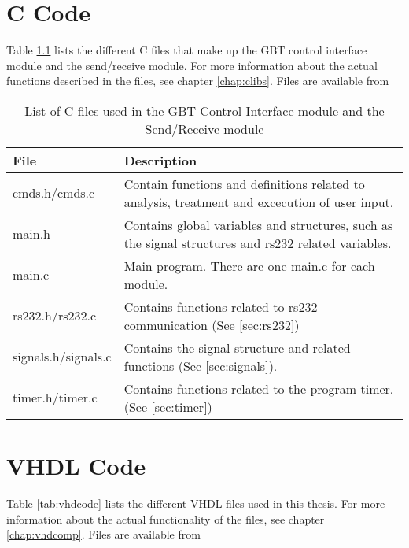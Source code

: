 \documentclass[main.tex]{subfiles}
\begin{document}
\chapter{C Code}

Table \ref{tab:ccode} lists the different C files that make up the GBT control interface module and the send/receive module. For more information about the actual functions described in the files, see chapter \ref{chap:clibs}. Files are available from 

\begin{table}[H]
\centering

\begin{tabular}{l p{8cm}}
\hline
 File & Description \\ \hline
 cmds.h/cmds.c & Contain functions and definitions related to analysis, treatment and excecution of user input.\\ %
 main.h & Contains global variables and structures, such as the signal structures and rs232 related variables. \\ %
 main.c & Main program. There are one main.c for each module.\\ %
 rs232.h/rs232.c & Contains functions related to rs232 communication (See \ref{sec:rs232})\\ %
 signals.h/signals.c & Contains the signal structure and related functions (See \ref{sec:signals}).\\ %
 timer.h/timer.c & Contains functions related to the program timer. (See \ref{sec:timer}) \\ \hline
\end{tabular}
\label{tab:ccode}
\caption{List of C files used in the GBT Control Interface module and the Send/Receive module}
\end{table}

\chapter{VHDL Code}

Table \ref{tab:vhdcode} lists the different VHDL files used in this thesis. For more information about the actual functionality of the files, see chapter \ref{chap:vhdcomp}. Files are available from 
\end{document}
